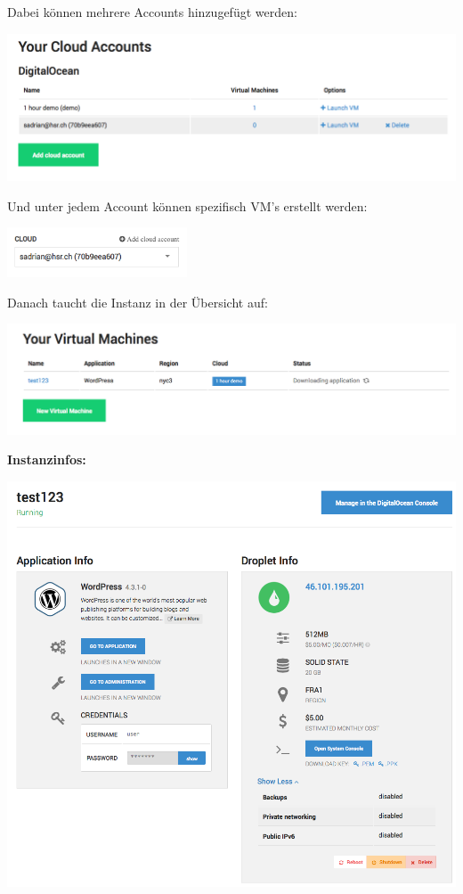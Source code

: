 \documentclass[11pt]{scrartcl}
\begin{document}
Dabei können mehrere Accounts hinzugefügt werden:

\includegraphics[width=\textwidth]{digitalocean_accounts}

Und unter jedem Account können spezifisch VM's erstellt werden:

\includegraphics[width=0.4\textwidth]{digitalocean_account_specific}

Danach taucht die Instanz in der Übersicht auf:

\includegraphics[width=\textwidth]{digitalocean_instances}

\newpage
\textbf{Instanzinfos:}

\includegraphics[width=\textwidth]{digitalocean_instanceinfo}
\end{document}
